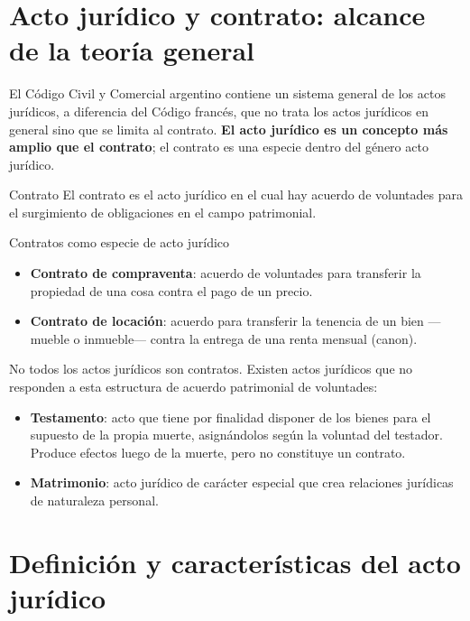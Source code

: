 \documentclass[12pt,oneside]{book}
\begin{document}
\section{Acto jurídico y contrato: alcance de la teoría general}

El Código Civil y Comercial argentino contiene un sistema general de los actos jurídicos, a diferencia del Código francés, que no trata los actos jurídicos en general sino que se limita al contrato. \textbf{El acto jurídico es un concepto más amplio que el contrato}; el contrato es una especie dentro del género acto jurídico.

\begin{definition}{Contrato}
El contrato es el acto jurídico en el cual hay acuerdo de voluntades para el surgimiento de obligaciones en el campo patrimonial.
\end{definition}

\begin{example}{Contratos como especie de acto jurídico}
\begin{itemize}
    \item \textbf{Contrato de compraventa}: acuerdo de voluntades para transferir la propiedad de una cosa contra el pago de un precio.
    \item \textbf{Contrato de locación}: acuerdo para transferir la tenencia de un bien —mueble o inmueble— contra la entrega de una renta mensual (canon).
\end{itemize}
\end{example}

No todos los actos jurídicos son contratos. Existen actos jurídicos que no responden a esta estructura de acuerdo patrimonial de voluntades:

\begin{itemize}
    \item \textbf{Testamento}: acto que tiene por finalidad disponer de los bienes para el supuesto de la propia muerte, asignándolos según la voluntad del testador. Produce efectos luego de la muerte, pero no constituye un contrato.
    \item \textbf{Matrimonio}: acto jurídico de carácter especial que crea relaciones jurídicas de naturaleza personal.
\end{itemize}

\section{Definición y características del acto jurídico}
\end{document}
